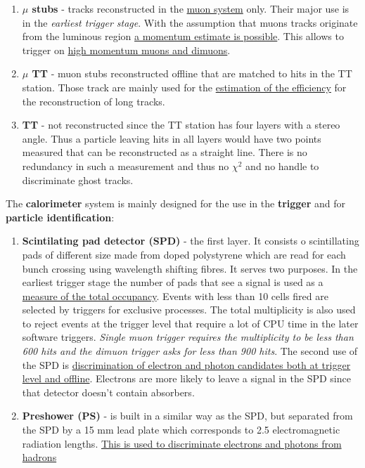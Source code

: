 \documentclass[11pt,a4paper,twoside]{article}
\begin{document}
\begin{enumerate}
\begin{enumerate}
            \item \textbf{$\mu$ stubs} - tracks reconstructed in the \underline{muon system} only. Their major use is in the \textit{earliest trigger stage}. With the assumption that muons tracks originate from the luminous region \underline{a momentum estimate is possible}. This allows to trigger on \underline{high momentum muons and dimuons}.
            
            \item \textbf{$\mu$ TT} - muon stubs reconstructed offline that are matched to hits in the TT station. Those track are mainly used for the \underline{estimation of the efficiency} for the reconstruction of long tracks.
            
            \item \textbf{TT} - not reconstructed since the TT station has four layers with a stereo angle. Thus a particle leaving hits in all layers would have two points measured that can be reconstructed as a straight line. There is no redundancy in such a measurement and thus no $\chi^2$ and no handle to discriminate ghost tracks.
        \end{enumerate}

        The \textbf{calorimeter} system is mainly designed for the use in the \textbf{trigger} and for \textbf{particle identification}:
        \begin{enumerate}
            \item \textbf{Scintilating pad detector (SPD)} - the first layer. It consists o scintillating pads of different size made from doped polystyrene which are read for each bunch crossing using wavelength shifting fibres. It serves two purposes. In the earliest trigger stage the number of pads that see a signal is used as a \underline{measure of the total occupancy}. Events with less than 10 cells fired are selected by triggers for exclusive processes. The total multiplicity is also used to reject events at the trigger level that require a lot of CPU time in the later software triggers. \textit{Single muon trigger requires the multiplicity to be less than 600 hits and the dimuon trigger asks for less than 900 hits}. The second use of the SPD is \underline{discrimination of electron and photon candidates both at trigger level and offline}. Electrons are more likely to leave a signal in the SPD since that detector doesn't contain absorbers.
            
            \item \textbf{Preshower (PS)} - is built in a similar way as the SPD, but separated from the SPD by a 15 mm lead plate which corresponds to 2.5 electromagnetic radiation lengths. \underline{This is used to discriminate electrons and photons from hadrons}
            

\end{enumerate}
\end{enumerate}
\end{document}
